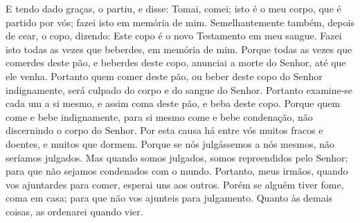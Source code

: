 {  E tendo dado graças, o partiu, e disse: Tomai, comei; isto é o meu corpo, que é partido por vós; fazei isto em memória de mim.
  Semelhantemente também, depois de cear,
{} o copo, dizendo: Este copo é o novo Testamento em meu sangue. Fazei isto todas as vezes que
{} beberdes, em memória de mim.
  Porque todas as vezes que comerdes deste pão, e beberdes deste copo, anunciai a morte do Senhor, até que ele venha.
  Portanto quem comer deste pão, ou beber deste copo do Senhor indignamente, será culpado do corpo e do sangue do Senhor.
  Portanto examine-se cada um a si mesmo, e assim coma deste pão, e beba deste copo.
  Porque quem come e bebe indignamente, para si mesmo come e bebe condenação, não discernindo o corpo do Senhor.
  Por esta causa há entre vós muitos fracos e doentes, e muitos que dormem.
  Porque se nós julgássemos a nós mesmos, não seríamos julgados.
  Mas quando somos julgados, somos repreendidos pelo Senhor; para que não sejamos condenados com o mundo.
  Portanto, meus irmãos, quando vos ajuntardes para comer, esperai uns aos outros.
  Porém se alguém tiver fome, coma em casa; para que não vos ajunteis para
{} julgamento. Quanto às demais coisas, as ordenarei quando vier.
\par }

